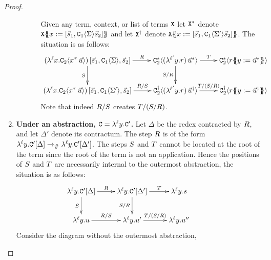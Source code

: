 \begin{proof}
\begin{enumerate}
\begin{enumerate}
\begin{enumerate}
      Given any term, context,
      or list of terms $\mathtt{X}$ let $\mathtt{X}^*$ denote $\mathtt{X}\{\!\!\{x := [\vec{s}_1,\mathtt{C}_1\langle\Sigma\rangle\vec{s}_2]\}\!\!\}$
      and let $\mathtt{X}^\dagger$ denote $\mathtt{X}\{\!\!\{x := [\vec{s}_1,\mathtt{C}_1\langle\Sigma'\rangle\vec{s}_2]\}\!\!\}$.
      The situation is as follows:
      \[
        \xymatrix{
          (\lamp{\lab}{\var}{\con_2\of{\var^\typ\,\ls{\tmthree}}})\,[\ls{\tmtwo}_1,\con_1\of{\Sigma},\ls{\tmtwo}_2]
          \ar[r]^-{\redex}
          \ar[d]_-{\redextwo}
        &
          \con_2^*\of{(\lamp{\labtwo}{\vartwo}{\tmfour})\,\ls{\tmthree}^*}
          \ar[d]_-{\redextwo/\redex}
          \ar[r]^-{\redexthree}
        &
          \con_2^*\of{  \tmfour\sub{\vartwo}{\ls{\tmthree}^*} }
        \\
          (\lamp{\lab}{\var}{\con_2\of{\var^\typ\,\ls{\tmthree}}})\,[\ls{\tmtwo}_1,\con_1\of{\Sigma'},\ls{\tmtwo}_2]
          \ar[r]^-{\redex/\redextwo}
        &
          \con_2^\dagger\of{(\lamp{\labtwo}{\vartwo}{\tmfour})\,\ls{\tmthree}^\dagger}
          \ar[r]^-{\redexthree/(\redextwo/\redex)}
        &
          \con_2^\dagger\of{  \tmfour\sub{\vartwo}{\ls{\tmthree}^\dagger} }
        }
      \]
      Note that indeed $R/S$ creates $T/(S/R)$.
    \end{enumerate}
  \end{enumerate}
\item {\bf Under an abstraction, $\mathtt{C} = \lambda^{\ell} y. \mathtt{C}'$.}
      \label{stability:case_under_abstraction}
  Let $\Delta$ be the redex contracted by $R$,
  and let $\Delta'$ denote its contractum.
  The step $R$ is of the form
  $\lambda^{\ell} y. \mathtt{C}'[\Delta] \mathrel{\to_{\mathtt{\#}}} \lambda^{\ell} y. \mathtt{C}'[\Delta']$.
  The steps $S$ and $T$ cannot be located at the root of the term
  since the root of the term is not an application.
  Hence the positions of $S$ and $T$ are necessarily internal
  to the outermost abstraction, \ie the situation is as follows:
  \[
    \xymatrix{
      \lamp{\lab}{\vartwo}{\con'[\Delta]}
      \ar[r]^-{\redex}
      \ar[d]_-{\redextwo}
    &
      \lamp{\lab}{\vartwo}{\con'[\Delta']}
      \ar[d]_-{\redextwo/\redex}
      \ar[r]^-{\redexthree}
    &
      \lamp{\lab}{\vartwo}{\tmtwo}
    \\
      \lamp{\lab}{\vartwo}{\tmthree}
      \ar[r]^-{\redex/\redextwo}
    &
      \ar[r]^-{\redexthree/(\redextwo/\redex)}
      \lamp{\lab}{\vartwo}{\tmthree'}
    &
      \lamp{\lab}{\vartwo}{\tmthree''}
    &
    }
  \]
  Consider the diagram without the outermost abstraction,

\end{enumerate}
\end{proof}
